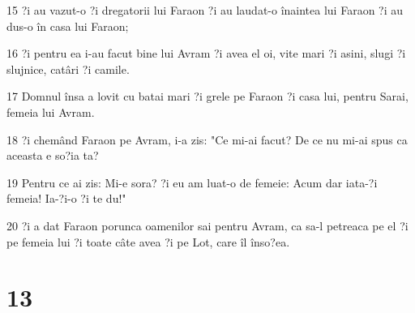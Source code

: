 \par 15 ?i au vazut-o ?i dregatorii lui Faraon ?i au laudat-o înaintea lui Faraon ?i au dus-o în casa lui Faraon;
\par 16 ?i pentru ea i-au facut bine lui Avram ?i avea el oi, vite mari ?i asini, slugi ?i slujnice, catâri ?i camile.
\par 17 Domnul însa a lovit cu batai mari ?i grele pe Faraon ?i casa lui, pentru Sarai, femeia lui Avram.
\par 18 ?i chemând Faraon pe Avram, i-a zis: "Ce mi-ai facut? De ce nu mi-ai spus ca aceasta e so?ia ta?
\par 19 Pentru ce ai zis: Mi-e sora? ?i eu am luat-o de femeie: Acum dar iata-?i femeia! Ia-?i-o ?i te du!"
\par 20 ?i a dat Faraon porunca oamenilor sai pentru Avram, ca sa-l petreaca pe el ?i pe femeia lui ?i toate câte avea ?i pe Lot, care îl înso?ea.

\chapter{13}

